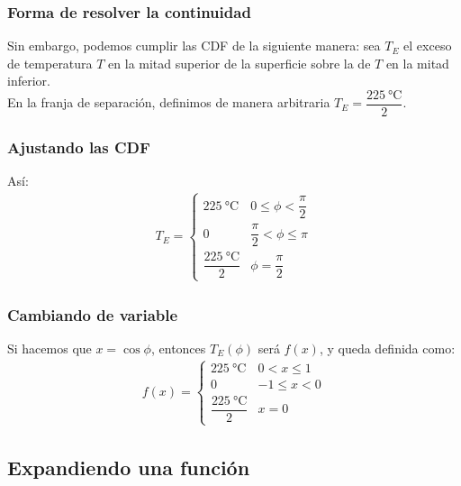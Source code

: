 \documentclass[12pt]{beamer}
\begin{document}
\begin{frame}
\frametitle{Forma de resolver la continuidad}
Sin embargo, podemos cumplir las CDF de la siguiente manera: \pause sea $T_{E}$ el exceso de temperatura  $T$ en la mitad superior de la superficie sobre la de $T$ en la mitad inferior.
\\
\bigskip
\pause
En la franja de separación, definimos de manera arbitraria $T_{E} = \dfrac{\SI{225}{\degreeCelsius}}{2}$.
\end{frame}
\begin{frame}
\frametitle{Ajustando las CDF}
Así:
\begin{align}
T_{E} = \begin{cases}
\SI{225}{\degreeCelsius} & 0 \leq \phi < \dfrac{\pi}{2} \\
0 & \dfrac{\pi}{2} < \phi \leq \pi \\
\dfrac{\SI{225}{\degreeCelsius}}{2} & \phi = \dfrac{\pi}{2}
\end{cases}
\label{eq:ecuacion_9_16}
\end{align}
\end{frame}
\begin{frame}
\frametitle{Cambiando de variable}
Si hacemos que $x = \cos \phi$, entonces $T_{E}(\phi)$ será $f(x)$, y queda definida como:
\begin{align}
f(x) = \begin{cases}
\SI{225}{\degreeCelsius} & 0 < x \leq 1 \\
0 & -1 \leq x < 0 \\
\dfrac{\SI{225}{\degreeCelsius}}{2} & x = 0
\end{cases}
\label{eq:ecuacion_9_17}
\end{align}
\end{frame}

\subsection{Expandiendo una función}
\end{document}
